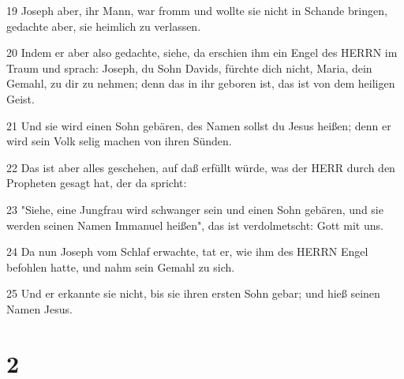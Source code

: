 \par 19 Joseph aber, ihr Mann, war fromm und wollte sie nicht in Schande bringen, gedachte aber, sie heimlich zu verlassen.
\par 20 Indem er aber also gedachte, siehe, da erschien ihm ein Engel des HERRN im Traum und sprach: Joseph, du Sohn Davids, fürchte dich nicht, Maria, dein Gemahl, zu dir zu nehmen; denn das in ihr geboren ist, das ist von dem heiligen Geist.
\par 21 Und sie wird einen Sohn gebären, des Namen sollst du Jesus heißen; denn er wird sein Volk selig machen von ihren Sünden.
\par 22 Das ist aber alles geschehen, auf daß erfüllt würde, was der HERR durch den Propheten gesagt hat, der da spricht:
\par 23 "Siehe, eine Jungfrau wird schwanger sein und einen Sohn gebären, und sie werden seinen Namen Immanuel heißen", das ist verdolmetscht: Gott mit uns.
\par 24 Da nun Joseph vom Schlaf erwachte, tat er, wie ihm des HERRN Engel befohlen hatte, und nahm sein Gemahl zu sich.
\par 25 Und er erkannte sie nicht, bis sie ihren ersten Sohn gebar; und hieß seinen Namen Jesus.

\chapter{2}

